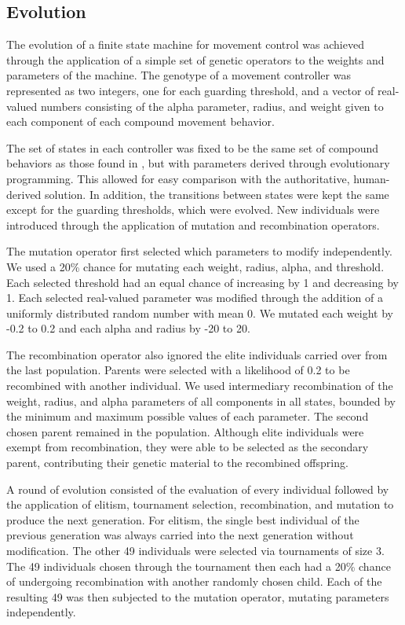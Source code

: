 \documentclass[12pt,journal,compsoc]{IEEEtran}
\begin{document}
\subsection{Evolution}

The evolution of a finite state machine for movement control was achieved through the application of a simple set of genetic operators to the weights and parameters of the machine. The genotype of a movement controller was represented as two integers, one for each guarding threshold, and a vector of real-valued numbers consisting of the alpha parameter, radius, and weight given to each component of each compound movement behavior.

The set of states in each controller was fixed to be the same set of compound behaviors as those found in \cite{rodriguez2004extending}, but with parameters derived through evolutionary programming. This allowed for easy comparison with the authoritative, human-derived solution. In addition, the transitions between states were kept the same except for the guarding thresholds, which were evolved. New individuals were introduced through the application of mutation and recombination operators.

The mutation operator first selected which parameters to modify independently. We used a 20\% chance for mutating each weight, radius, alpha, and threshold. Each selected threshold had an equal chance of increasing by 1 and decreasing by 1. Each selected real-valued parameter was modified through the addition of a uniformly distributed random number with mean 0. We mutated each weight by -0.2 to 0.2 and each alpha and radius by -20 to 20.

The recombination operator also ignored the elite individuals carried over from the last population. Parents were selected with a likelihood of 0.2 to be recombined with another individual. We used intermediary recombination of the weight, radius, and alpha parameters of all components in all states, bounded by the minimum and maximum possible values of each parameter. The second chosen parent remained in the population. Although elite individuals were exempt from recombination, they were able to be selected as the secondary parent, contributing their genetic material to the recombined offspring.

A round of evolution consisted of the evaluation of every individual followed by the application of elitism, tournament selection, recombination, and mutation to produce the next generation. For elitism, the single best individual of the previous generation was always carried into the next generation without modification. The other 49 individuals were selected via tournaments of size 3. The 49 individuals chosen through the tournament then each had a 20\% chance of undergoing recombination with another randomly chosen child. Each of the resulting 49 was then subjected to the mutation operator, mutating parameters independently.
\end{document}
